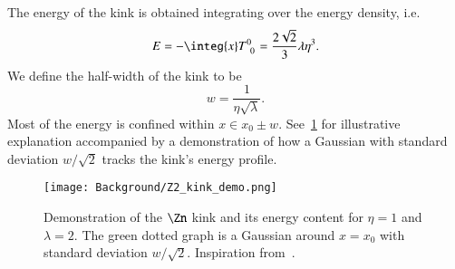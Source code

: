         The energy of the kink is obtained integrating over the energy density, i.e.%
        \begin{equation}\label{eq:cosmo:defects:energy_of_Z2_kink}
            E = -\integ{x} T\indices{^0_0} = \frac{2\sqrt{2 }}{3} \lambda \eta^3.
        \end{equation}
        We define the half-width of the kink to be %
        \begin{equation}
            w = \frac{1}{\eta\sqrt{\lambda}}.
        \end{equation}
        Most of the energy is confined within $x \in x_0 \pm w$. See~\cref{fig:cosmo:defects:Z2_kink_demo} for illustrative explanation accompanied by a demonstration of how a Gaussian with standard deviation $w/\sqrt{2}$ tracks the kink's energy profile. %
        \begin{figure}[H]
            \centering
            \texttt{[image: Background/Z2\_kink\_demo.png]}
            \caption{Demonstration of the $\Zn$ kink and its energy content for $\eta =1$ and $\lambda=2$. The green dotted graph is a Gaussian around $x=x_0$ with standard deviation $w/\sqrt{2}$. Inspiration from~\citet{vachaspatiKinksDomainWalls2006}.}
            \label{fig:cosmo:defects:Z2_kink_demo}
        \end{figure}

    







